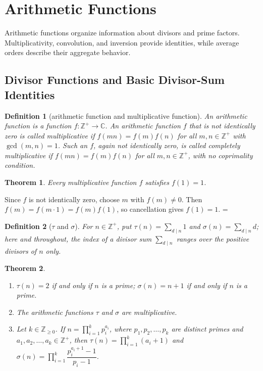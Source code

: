 \documentclass[11pt]{article}
\makeatletter
\theoremstyle{ntstyle}
\newtheorem{theorem}{Theorem}[subsection]
\newtheorem{definition}{Definition}[subsection]
\newcommand{\statementitems}{\mbox{}}
\let\nt@closedisplay\]
\def\nt@guardedclose{\@ifnextchar\par{\nt@closeafterpar}{\@ifnextchar\end{\postdisplaypenalty\@M\nt@closedisplay}{\nt@closedisplay}}}
\def\nt@closeafterpar\par{\@ifnextchar\par{\nt@closeafterpar}{\@ifnextchar\end{\postdisplaypenalty\@M\nt@closedisplay\par}{\nt@closedisplay\par}}}
\renewenvironment{proof}[1][\proofname]{\par
  \pushQED{\qed}\normalfont\topsep\medskipamount\edef\nt@afterproof{\@endparpenalty=\the\@endparpenalty\relax}\@beginparpenalty\@M\@endparpenalty\@M\let\]\nt@guardedclose\trivlist\item[]\textit{#1\@addpunct{.}} \ignorespaces}{\ifvmode\addpenalty\@M\fi\popQED\nt@afterproof\endtrivlist\@endpefalse}
\makeatother
\begin{document}
\section{Arithmetic Functions}

Arithmetic functions organize information about divisors and prime factors. Multiplicativity, convolution, and
inversion provide identities, while average orders describe their aggregate behavior.

\subsection{Divisor Functions and Basic Divisor-Sum Identities}

\begin{definition}[arithmetic function and multiplicative function]\label{def:5.1.1} An
	arithmetic function is a function $f:\mathbb{Z}^+\to\mathbb{C}$. An arithmetic
	function $f$ that is not identically zero is called multiplicative
	if $f(mn)=f(m)f(n)$ for all $m,n\in\mathbb{Z}^+$
	with $\gcd(m, n)=1$. Such an $f$, again not identically zero, is called completely multiplicative
	if $f(mn)=f(m)f(n)$ for all $m,n\in\mathbb{Z}^+$, with no coprimality condition.
\end{definition}
\begin{theorem}\label{thm:5.1.1}
	Every multiplicative function $f$ satisfies $f(1)=1$.
\end{theorem}

\begin{proof} Since $f$ is not identically zero, choose $m$ with
	$f(m)\neq0$. Then $f(m)=f(m\cdot1)=f(m)f(1)$, so cancellation gives
	$f(1)=1$.
\end{proof}
\begin{definition}[$\tau$ and $\sigma$]\label{def:5.1.2} For $n \in \mathbb{Z}^+$, put $\tau(n) =
		\sum_{d \mid n} 1$ and $\sigma(n) = \sum_{d \mid n} d$; here and throughout, the index of a
		divisor sum $\sum_{d \mid n}$ ranges over the positive divisors of $n$ only.
\end{definition}
\begin{theorem}\label{thm:5.1.2}\statementitems

	\begin{enumerate}[label={\alph*)}]
		\item $\tau(n) = 2$ if and only if $n$ is a prime; $\sigma(n) = n
						+ 1$ if and only if $n$ is a prime.
		\item The arithmetic functions $\tau$ and $\sigma$ are multiplicative.
		\item Let $k\in\mathbb{Z}_{\ge0}$. If $n=\prod_{i=1}^{k}p_i^{a_i}$, where $p_1,p_2,\ldots,p_k$
					are distinct primes and $a_1,a_2,\ldots,a_k\in\mathbb{Z}^+$, then
					$\tau(n)=\prod_{i=1}^{k}(a_i+1)$ and
					$\sigma(n)=\prod_{i=1}^{k}\dfrac{p_i^{a_i+1}-1}{p_i-1}$.
	\end{enumerate}
\end{theorem}
\end{document}
